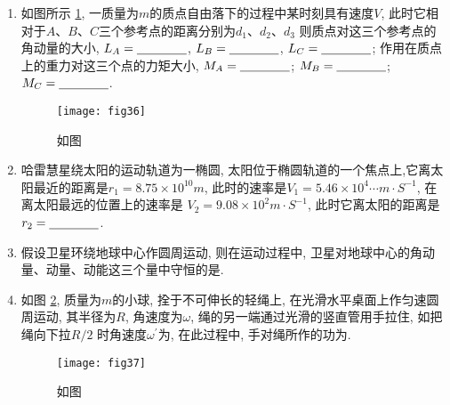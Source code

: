 \begin{enumerate}
    \item 如图所示 \ref{fig:36}, 一质量为$m$的质点自由落下的过程中某时刻具有速度$V$,
    此时它相对于$A$、$B$、$C$三个参考点的距离分别为$d_1、d_2、d_3$
    则质点对这三个参考点的角动量的大小, $L_A=\nl$, 
    $L_B=\nl$, $L_C=\nl$; 作用在质点上的重力对这三个点的力矩大小,
    $M_A=\nl$; $M_B=\nl$; $M_C=\nl$.
    \begin{figure}[h]
        \centering
        \texttt{[image: fig36]}
            \caption{如图}\label{fig:36}
    \end{figure}
    \item 哈雷慧星绕太阳的运动轨道为一椭圆, 太阳位于椭圆轨道的一个焦点上,它离太阳最近的距离是$r_1=8.75\times10^{10}m$, 此时的速率是$V_1=5.46\times10^4\cdots m\cdot S^{-1}$, 在离太阳最远的位置上的速率是
    $V_2=9.08\times 10^2 m·S^{-1}$, 此时它离太阳的距离是$r_2=\nl$.
    \item 假设卫星环绕地球中心作圆周运动, 则在运动过程中, 卫星对地球中心的角动量、动量、动能这三个量中守恒的是\nl .
    \item 如图 \ref{fig:37}, 质量为$m$的小球, 拴于不可伸长的轻绳上, 在光滑水平桌面上作匀速圆周运动, 其半径为$R$, 角速度为$\omega$, 绳的另一端通过光滑的竖直管用手拉住, 如把绳向下拉$R/2$
    时角速度$\omega^{'}$为\nl , 在此过程中, 手对绳所作的功为\nl .
    \begin{figure}[h]
        \centering
        \texttt{[image: fig37]}
            \caption{如图}\label{fig:37}
    \end{figure}
\end{enumerate}
